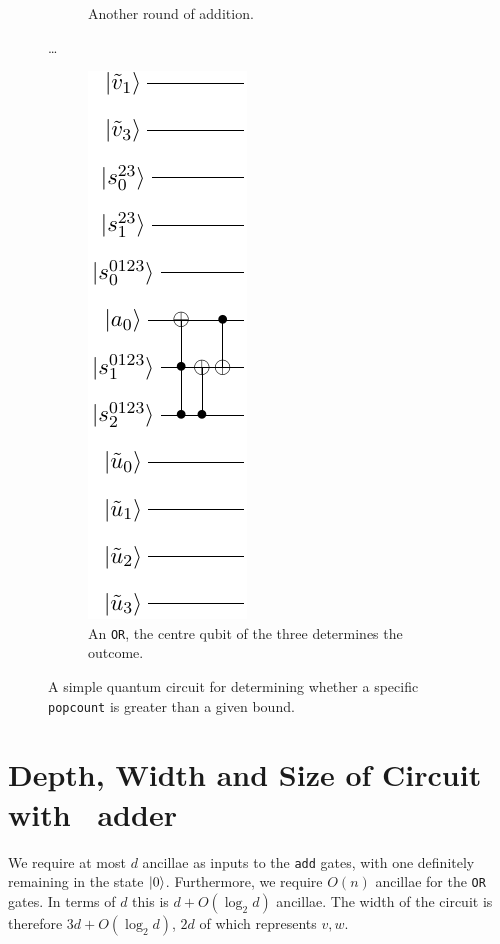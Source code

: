 \documentclass[notitlepage]{article}
\theoremstyle{definition}
\begin{document}
\begin{figure}
\begin{subfigure}{.3\textwidth}
        \caption{Another round of addition.}\label{subfig:naive_popcnt2}
    \end{subfigure}
    \dots
    \begin{subfigure}{.3\textwidth}
        \centering
        \includegraphics{popcnt_sieve_pt3}
        \caption{An \texttt{OR}, the centre qubit of the three determines the outcome.}\label{subfig:naive_popcnt3}
    \end{subfigure}
    \caption{A simple quantum circuit for determining whether a specific \texttt{popcount} is greater than a given bound.}\label{fig:naive_popcnt}
\end{figure}

\section*{Depth, Width and Size of Circuit with~\cite{cuccaro2004new} adder}

We require at most $d$ ancillae as inputs to the \texttt{add} gates, with one definitely remaining in the state $\ket{0}$.
Furthermore, we require $O(n)$ ancillae for the \texttt{OR} gates.
In terms of $d$ this is $d + O(\log_{2}d)$ ancillae. The width of the circuit is therefore $3d + O(\log_{2}d)$, $2d$ of which represents $v, w$.
\end{document}
